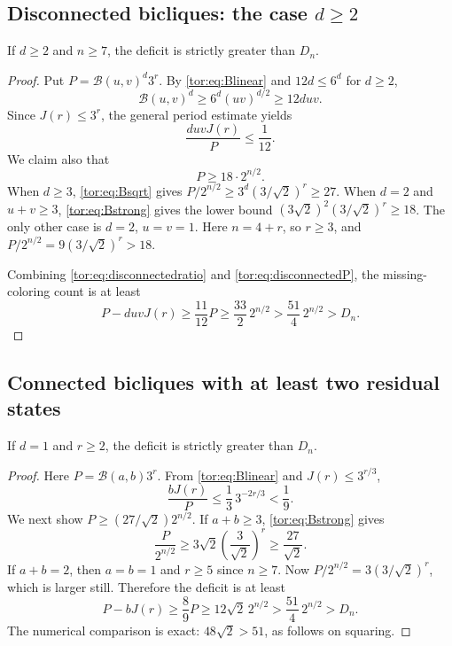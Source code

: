 \documentclass[11pt,a4paper]{article}
\numberwithin{equation}{section}
\theoremstyle{definition}
\theoremstyle{remark}
\newcommand{\Bip}{\mathcal B}
\begin{document}
\subsection{Disconnected bicliques: the case \texorpdfstring{$d\ge2$}{d >= 2}}

\begin{lemma}\label{tor:lem:disconnected}
If $d\ge2$ and $n\ge7$, the deficit is strictly greater than $D_n$.
\end{lemma}
\begin{proof}
Put $P=\Bip(u,v)^d3^r$. By \eqref{tor:eq:Blinear} and $12d\le6^d$ for
$d\ge2$,
\[
 \Bip(u,v)^d\ge6^d(uv)^{d/2}\ge12duv.
\]
Since $J(r)\le3^r$, the general period estimate yields
\begin{equation}\label{tor:eq:disconnectedratio}
 \frac{duvJ(r)}P\le\frac1{12}.
\end{equation}
We claim also that
\begin{equation}\label{tor:eq:disconnectedP}
 P\ge18\cdot2^{n/2}.
\end{equation}
When $d\ge3$, \eqref{tor:eq:Bsqrt} gives $P/2^{n/2}\ge3^d(3/\sqrt2)^r\ge27$.
When $d=2$ and $u+v\ge3$, \eqref{tor:eq:Bstrong} gives the lower bound
$(3\sqrt2)^2(3/\sqrt2)^r\ge18$. The only other case is $d=2$, $u=v=1$. Here
$n=4+r$, so $r\ge3$, and $P/2^{n/2}=9(3/\sqrt2)^r>18$.

Combining \eqref{tor:eq:disconnectedratio} and \eqref{tor:eq:disconnectedP},
the missing-coloring count is at least
\[
 P-duvJ(r)\ge\frac{11}{12}P
 \ge\frac{33}{2}\,2^{n/2}
 >\frac{51}{4}\,2^{n/2}>D_n.
\]
\end{proof}

\subsection{Connected bicliques with at least two residual states}

\begin{lemma}\label{tor:lem:residualmany}
If $d=1$ and $r\ge2$, the deficit is strictly greater than $D_n$.
\end{lemma}
\begin{proof}
Here $P=\Bip(a,b)3^r$. From \eqref{tor:eq:Blinear} and $J(r)\le3^{r/3}$,
\[
 \frac{bJ(r)}P\le\frac13\,3^{-2r/3}<\frac19.
\]
We next show $P\ge(27/\sqrt2)2^{n/2}$. If $a+b\ge3$, \eqref{tor:eq:Bstrong}
gives
\[
 \frac{P}{2^{n/2}}
 \ge3\sqrt2\left(\frac3{\sqrt2}\right)^r
 \ge\frac{27}{\sqrt2}.
\]
If $a+b=2$, then $a=b=1$ and $r\ge5$ since $n\ge7$. Now
$P/2^{n/2}=3(3/\sqrt2)^r$, which is larger still. Therefore the deficit is at
least
\[
 P-bJ(r)\ge\frac89P
 \ge12\sqrt2\,2^{n/2}
 >\frac{51}{4}\,2^{n/2}>D_n.
\]
The numerical comparison is exact: $48\sqrt2>51$, as follows on squaring.
\end{proof}
\end{document}
